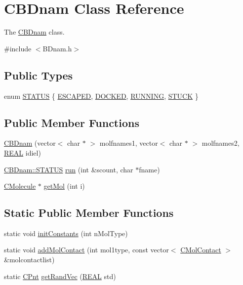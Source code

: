\hypertarget{classCBDnam}{\section{C\-B\-Dnam Class Reference}
\label{classCBDnam}
}


The \hyperlink{classCBDnam}{C\-B\-Dnam} class.  




{\ttfamily \#include $<$B\-Dnam.\-h$>$}

\subsection*{Public Types}
\begin{DoxyCompactItemize}
\item 
enum \hyperlink{classCBDnam_a9b511229c3d251ea1d4bae1c67d0ea8f}{S\-T\-A\-T\-U\-S} \{ \hyperlink{classCBDnam_a9b511229c3d251ea1d4bae1c67d0ea8fa9e12a628623c6235f9df2086d7b801ca}{E\-S\-C\-A\-P\-E\-D}, 
\hyperlink{classCBDnam_a9b511229c3d251ea1d4bae1c67d0ea8fabea72b0c444a7d389435b3b22be00b90}{D\-O\-C\-K\-E\-D}, 
\hyperlink{classCBDnam_a9b511229c3d251ea1d4bae1c67d0ea8fab5cac5babdaabba5b3c28b55b54bcfbc}{R\-U\-N\-N\-I\-N\-G}, 
\hyperlink{classCBDnam_a9b511229c3d251ea1d4bae1c67d0ea8fa09fbb1316278782c3117ea3c6192e696}{S\-T\-U\-C\-K}
 \}
\end{DoxyCompactItemize}
\subsection*{Public Member Functions}
\begin{DoxyCompactItemize}
\item 
\hyperlink{classCBDnam_a0032bfc247d677d5b6cd3937ed5f9fbb}{C\-B\-Dnam} (vector$<$ char $\ast$ $>$ molfnames1, vector$<$ char $\ast$ $>$ molfnames2, \hyperlink{util_8h_a5821460e95a0800cf9f24c38915cbbde}{R\-E\-A\-L} idiel)
\item 
\hyperlink{classCBDnam_a9b511229c3d251ea1d4bae1c67d0ea8f}{C\-B\-Dnam\-::\-S\-T\-A\-T\-U\-S} \hyperlink{classCBDnam_a07205701ed2267dc0457a4d621bb8aa8}{run} (int \&scount, char $\ast$fname)
\item 
\hyperlink{classCMolecule}{C\-Molecule} $\ast$ \hyperlink{classCBDnam_a715cfb64faa6369a733f9f6d0bd64350}{get\-Mol} (int i)
\end{DoxyCompactItemize}
\subsection*{Static Public Member Functions}
\begin{DoxyCompactItemize}
\item 
static void \hyperlink{classCBDnam_abee84e16de486d43f3bed18117c7031d}{init\-Constants} (int n\-Mol\-Type)
\item 
static void \hyperlink{classCBDnam_ab8b1d8c651f08545a9779617fbb3ba28}{add\-Mol\-Contact} (int mol1type, const vector$<$ \hyperlink{classCMolContact}{C\-Mol\-Contact} $>$ \&molcontactlist)
\item 
static \hyperlink{classCPnt}{C\-Pnt} \hyperlink{classCBDnam_a3f3175ac827dba969004309109e8e70c}{get\-Rand\-Vec} (\hyperlink{util_8h_a5821460e95a0800cf9f24c38915cbbde}{R\-E\-A\-L} std)
\end{DoxyCompactItemize}
